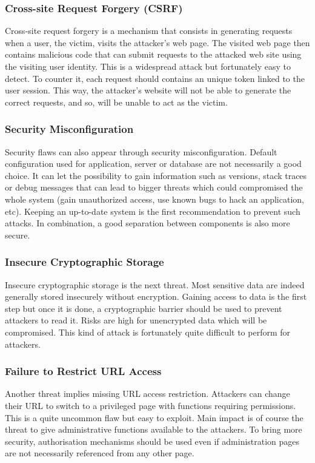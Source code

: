 \subsubsection{Cross-site Request Forgery (CSRF)}
Cross-site request forgery is a mechanism that consists in generating requests
when a user, the victim, visits the attacker's web page. The visited web page
then contains malicious code that can submit requests to the attacked web site
using the visiting user identity. This is a widespread attack but fortunately
easy to detect. To counter it, each request should contains an unique token
linked to the user session. This way, the attacker's website will not be able
to generate the correct requests, and so, will be unable to act as the victim.

\subsubsection{Security Misconfiguration}
Security flaws can also appear through security misconfiguration. Default
configuration used for application, server or database are not necessarily a
good choice. It can let the possibility to gain information such as versions,
stack traces or debug messages that can lead to bigger threats which could
compromised the whole system (gain unauthorized access, use known bugs to hack
an application, etc). Keeping an up-to-date system is the first recommendation
to prevent such attacks. In combination, a good separation between components
is also more secure.

\subsubsection{Insecure Cryptographic Storage}
Insecure cryptographic storage is the next threat. Most sensitive data are
indeed generally stored insecurely without encryption. Gaining access to data is
the first step but once it is done, a cryptographic barrier should be used to
prevent attackers to read it. Risks are high for unencrypted data which will
be compromised. This kind of attack is fortunately quite difficult to perform
for attackers.

\subsubsection{Failure to Restrict URL Access}
Another threat implies missing URL access restriction. Attackers can change
their URL to switch to a privileged page with functions requiring
permissions. This is a quite uncommon flaw but easy to exploit. Main impact is
of course the threat to give administrative functions available to the
attackers. To bring more security, authorisation mechanisms should be used
even if administration pages are not necessarily referenced from any other
page.

